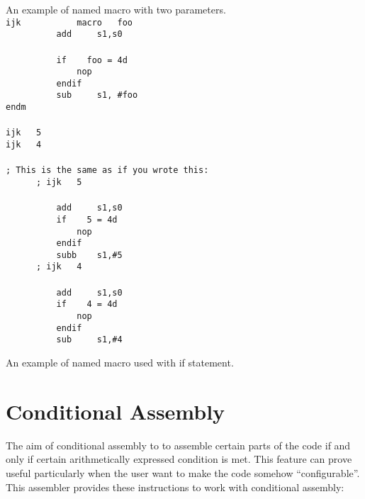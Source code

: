     An example of named macro with two parameters.\\
    {
        \usecodefont
        \verb'ijk           macro   foo'\\
        \verb'          add     s1,s0'\\
        \verb''\\
        \verb'          if    foo = 4d'\\
        \verb'              nop'\\
        \verb'          endif'\\
        \verb'          sub     s1, #foo'\\
        \verb'endm'\\\\
        \verb'ijk   5'\\
        \verb'ijk   4'\\\\
        \verb'; This is the same as if you wrote this:'\\
        \verb'      ; ijk   5'\\\\
        \verb'          add     s1,s0'\\
        \verb'          if    5 = 4d'\\
        \verb'              nop'\\
        \verb'          endif'\\
        \verb'          subb    s1,#5'\\
        \verb'      ; ijk   4'\\\\
        \verb'          add     s1,s0'\\
        \verb'          if    4 = 4d'\\
        \verb'              nop'\\
        \verb'          endif'\\
        \verb'          sub     s1,#4'\\
    }

    An example of named macro used with if statement.

\section{Conditional Assembly}
The aim of conditional assembly to to assemble certain parts of the code if and only if certain arithmetically expressed condition is met. This feature can prove useful particularly when the user want to make the code somehow ``configurable''. This assembler provides these instructions to work with conditional assembly:

